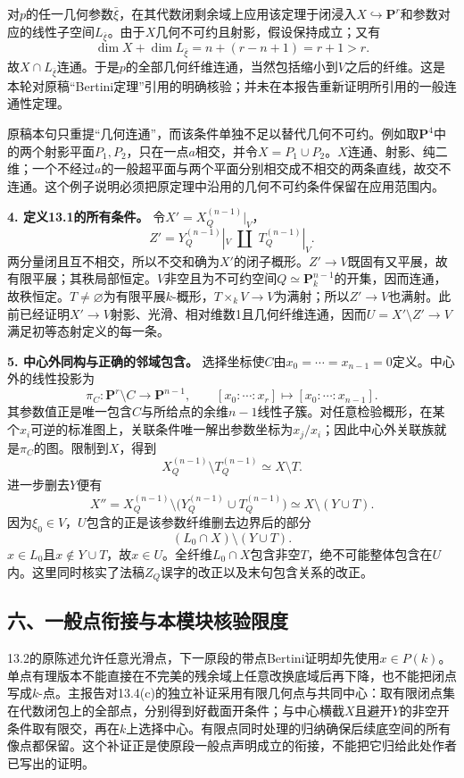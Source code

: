 \documentclass[UTF8,a4paper]{ctexbook}
\begin{document}
对$p$的任一几何参数$\bar\xi$，在其代数闭剩余域上应用该定理于闭浸入$X\hookrightarrow\mathbf P^r$和参数对应的线性子空间$L_{\bar\xi}$。由于$X$几何不可约且射影，假设保持成立；又有
\[
\dim X+\dim L_{\bar\xi}
=n+(r-n+1)=r+1>r.
\]
故$X\cap L_{\bar\xi}$连通。于是$p$的全部几何纤维连通，当然包括缩小到$V$之后的纤维。这是本轮对原稿“Bertini定理”引用的明确核验；并未在本报告重新证明所引用的一般连通性定理。

原稿本句只重提“几何连通”，而该条件单独不足以替代几何不可约。例如取$\mathbf P^4$中的两个射影平面$P_1,P_2$，只在一点$a$相交，并令$X=P_1\cup P_2$。$X$连通、射影、纯二维；一个不经过$a$的一般超平面与两个平面分别相交成不相交的两条直线，故交不连通。这个例子说明必须把原定理中沿用的几何不可约条件保留在应用范围内。

\noindent\textbf{4. 定义13.1的所有条件。}
令$X'=X_Q^{(n-1)}|_V$，
\[
Z'=Y_Q^{(n-1)}|_V\;\amalg\;T_Q^{(n-1)}|_V.
\]
两分量闭且互不相交，所以不交和确为$X'$的闭子概形。$Z'\to V$既固有又平展，故有限平展；其秩局部恒定。$V$非空且为不可约空间$Q\simeq\mathbf P^{n-1}_k$的开集，因而连通，故秩恒定。$T\ne\varnothing$为有限平展$k$-概形，$T\times_k V\to V$为满射；所以$Z'\to V$也满射。此前已经证明$X'\to V$射影、光滑、相对维数1且几何纤维连通，因而$U=X'\setminus Z'\to V$满足初等态射定义的每一条。

\noindent\textbf{5. 中心外同构与正确的邻域包含。}
选择坐标使$C$由$x_0=\cdots=x_{n-1}=0$定义。中心外的线性投影为
\[
\pi_C:\mathbf P^r\setminus C\longrightarrow\mathbf P^{n-1},
\qquad [x_0:\cdots:x_r]\longmapsto[x_0:\cdots:x_{n-1}].
\]
其参数值正是唯一包含$C$与所给点的余维$n-1$线性子簇。对任意检验概形，在某个$x_i$可逆的标准图上，关联条件唯一解出参数坐标为$x_j/x_i$；因此中心外关联族就是$\pi_C$的图。限制到$X$，得到
\[
X_Q^{(n-1)}\setminus T_Q^{(n-1)}\simeq X\setminus T.
\]
进一步删去$Y$便有
\[
X''=X_Q^{(n-1)}\setminus\bigl(Y_Q^{(n-1)}\cup T_Q^{(n-1)}\bigr)
\simeq X\setminus(Y\cup T).
\]
因为$\xi_0\in V$，$U$包含的正是该参数纤维删去边界后的部分
\[
(L_0\cap X)\setminus(Y\cup T).
\]
$x\in L_0$且$x\notin Y\cup T$，故$x\in U$。全纤维$L_0\cap X$包含非空$T$，绝不可能整体包含在$U$内。这里同时核实了法稿$Z_Q$误字的改正以及末句包含关系的改正。

\subsection*{六、一般点衔接与本模块核验限度}

13.2的原陈述允许任意光滑点，下一原段的带点Bertini证明却先使用$x\in P(k)$。单点有理版本不能直接在不完美的残余域上任意改换底域后再下降，也不能把闭点写成$k$-点。主报告对13.4(c)的独立补证采用有限几何点与共同中心：取有限闭点集在代数闭包上的全部点，分别得到好截面开条件；与中心横截$X$且避开$Y$的非空开条件取有限交，再在$k$上选择中心。有限点同时处理的归纳确保后续底空间的所有像点都保留。这个补证正是使原段一般点声明成立的衔接，不能把它归给此处作者已写出的证明。
\end{document}

